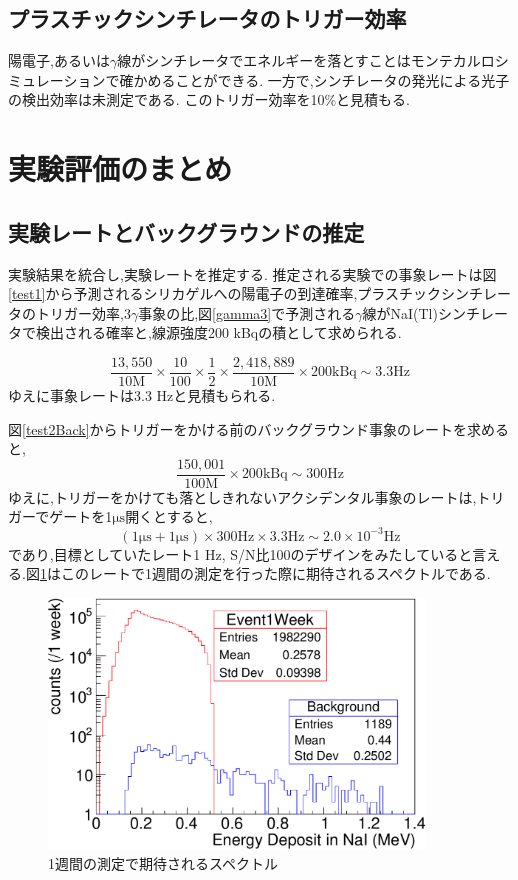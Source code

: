 \subsection{プラスチックシンチレータのトリガー効率}
陽電子,あるいは$\gamma$線がシンチレータでエネルギーを落とすことはモンテカルロシミュレーションで確かめることができる.
一方で,シンチレータの発光による光子の検出効率は未測定である.
このトリガー効率を10\%と見積もる.

\section{実験評価のまとめ}
\label{section_testall}

\subsection{実験レートとバックグラウンドの推定}
実験結果を統合し,実験レートを推定する.
推定される実験での事象レートは図\ref{test1}から予測されるシリカゲルへの陽電子の到達確率,プラスチックシンチレータのトリガー効率,$3\gamma$事象の比,図\ref{gamma3}で予測される$\gamma$線がNaI(Tl)シンチレータで検出される確率と,線源強度200 kBqの積として求められる.

\begin{equation}
	\nonumber
	\frac{13,550}{10 \mathrm{M}} \times \frac{10}{100} \times \frac{1}{2} \times \frac{2,418,889}{10 \mathrm{M}} \times 200 \mathrm{kBq} \sim 3.3 \mathrm{Hz}
\end{equation}
ゆえに事象レートは3.3 Hzと見積もられる.

図\ref{test2Back}からトリガーをかける前のバックグラウンド事象のレートを求めると,
\begin{equation}
	\nonumber
	\frac{150,001}{100\mathrm{M}} \times 200 \mathrm{kBq} \sim 300 \mathrm{ Hz}
\end{equation}
ゆえに,トリガーをかけても落としきれないアクシデンタル事象のレートは,トリガーでゲートを1$\si{\micro \second}$開くとすると,
\begin{equation}
	\nonumber
	( 1 \si{\micro \second} + 1 \si{\micro \second}) \times  300 \mathrm{Hz} \times 3.3 \mathrm{Hz} \sim 2.0 \times 10^{-3} \mathrm{Hz}
\end{equation}
であり,目標としていたレート1 Hz, S/N比100のデザインをみたしていると言える.図\ref{test_all}はこのレートで1週間の測定を行った際に期待されるスペクトルである.

\begin{figure}[!tbp]
	\centering
		\includegraphics[width=10cm]{fig/test_all.pdf}
	\caption{1週間の測定で期待されるスペクトル}
	\label{test_all}
\end{figure}

